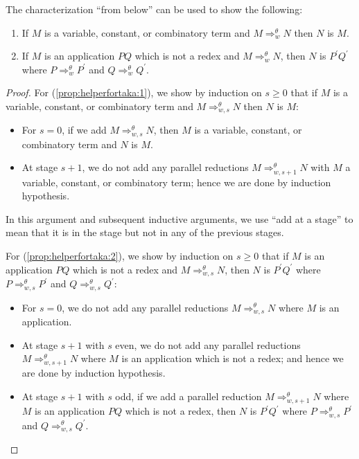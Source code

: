 \documentclass{lmcs} %
\newcommand{\param}{\theta}
\newcommand{\Reduces}[2]{\Rightarrow_{#1}^{#2}}
\begin{document}
The characterization ``from below'' can be used to show the following:
\begin{prop}\label{prop:helperfortaka}\hfill
\begin{enumerate}[leftmargin=*]
    \item \label{prop:helperfortaka:1} If $M$ is a variable, constant, or combinatory term and $M\Reduces{w}{\param} N$ then $N$ is $M$.
    \item \label{prop:helperfortaka:2} If $M$ is an application $PQ$ which is not a redex and  $M\Reduces{w}{\param} N$, then $N$ is $P^{\prime}Q^{\prime}$ where $P\Reduces{w}{\param} P^{\prime}$ and $Q\Reduces{w}{\param} Q^{\prime}$.
\end{enumerate}
\end{prop}
\begin{proof}
For (\ref{prop:helperfortaka:1}), we show by induction on $s\geq 0$ that if $M$ is a variable, constant, or combinatory term and $M\Reduces{w,s}{\param} N$ then $N$ is $M$:
\begin{itemize}[leftmargin=*]
    \item For $s=0$, if we add $M\Reduces{w,s}{\param} N$, then  $M$ is a variable, constant, or combinatory term and $N$ is $M$.
    \item At stage $s+1$, we do not add any parallel reductions $M\Reduces{w,s+1}{\param} N$ with $M$ a variable, constant, or combinatory term; hence we are done by induction hypothesis.
\end{itemize}
In this argument and subsequent inductive arguments, we use ``add at a stage'' to mean that it is in the stage but not in any of the previous stages. 

For (\ref{prop:helperfortaka:2}), we show by induction on $s\geq 0$ that if $M$ is an application $PQ$ which is not a redex and  $M\Reduces{w,s}{\param} N$, then $N$ is $P^{\prime}Q^{\prime}$ where $P\Reduces{w,s}{\param} P^{\prime}$ and $Q\Reduces{w,s}{\param} Q^{\prime}$:
\begin{itemize}[leftmargin=*]
\item For $s=0$, we do not add any parallel reductions $M\Reduces{w,s}{\param} N$ where $M$ is an application.
\item At stage $s+1$ with $s$ even, we do not add any parallel reductions $M\Reduces{w,s+1}{\param} N$ where $M$ is an application which is not a redex; and hence we are done by induction hypothesis.
\item At stage $s+1$ with $s$ odd, if we add a parallel reduction $M\Reduces{w,s+1}{\param} N$ where $M$ is an application $PQ$ which is not a redex, then $N$ is $P^{\prime} Q^{\prime}$ where $P\Reduces{w,s}{\param} P^{\prime}$ and $Q\Reduces{w,s}{\param} Q^{\prime}$.
\end{itemize}
\end{proof}
\end{document}
